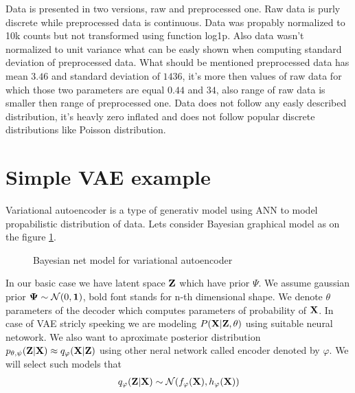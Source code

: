 \documentclass[12pt,a4paper]{article}
\begin{document}
Data is presented in two versions, raw and preprocessed one.
Raw data is purly discrete while preprocessed data is continuous. Data was propably normalized to 10k counts but not transformed using function log1p. 
Also data wasn't normalized to unit variance what can be easly shown when computing standard deviation of preprocessed data.
What should be mentioned preprocessed data has mean $3.46$ and standard deviation of $1436$, it's more 
then values of raw data for which those two parameters are equal $0.44$ and $34$, also range of raw data is smaller then range of preprocessed one. 
Data does not follow any 
easly described distribution, it's heavly zero inflated and does not follow popular discrete distributions like Poisson distribution.

\section{Simple VAE example}
\hspace{1cm} Variational autoencoder is a type of generativ model using ANN to model propabilistic distribution of data. Lets consider Bayesian graphical 
model as on the figure \ref{VAE}.
\begin{figure}[H]
    \centering
    \caption{Bayesian net model for variational autoencoder}
    \label{VAE}
    \centering
\end{figure}
In our basic case we have latent space $\vb{Z}$ which have prior $\Psi$. We assume gaussian prior $\vb{\Psi} \sim \mathcal{N}(0,\vb{1})$,
bold font stands for n-th dimensional shape. We denote $\theta$ parameters of the decoder which computes parameters of probability of $\vb{X}$.
In case of VAE stricly speeking we are modeling $P(\vb{X}|\vb{Z},\theta)$ using suitable neural netowork. 
We also want to aproximate posterior distribution $p_{\theta,\psi}(\vb{Z}|\vb{X})\approx q_\varphi(\vb{X}|\vb{Z})$ using other neral network called encoder 
denoted by $\varphi$. We will select such models that
\begin{align}
    q_\varphi(\vb{Z}|\vb{X})\sim \mathcal{N}(f_\varphi(\vb{X}),h_\varphi(\vb{X}))
\end{align}
\end{document}
